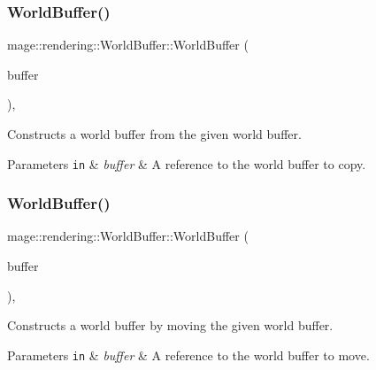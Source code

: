 \subsubsection{\texorpdfstring{World\+Buffer()}{WorldBuffer()}\hspace{0.1cm}{\footnotesize\ttfamily [2/3]}}
{\footnotesize\ttfamily mage\+::rendering\+::\+World\+Buffer\+::\+World\+Buffer (\begin{DoxyParamCaption}\item[{const \mbox{\hyperlink{structmage_1_1rendering_1_1_world_buffer}{World\+Buffer}} \&}]{buffer }\end{DoxyParamCaption})\hspace{0.3cm}{\ttfamily [default]}, {\ttfamily [noexcept]}}

Constructs a world buffer from the given world buffer.


\begin{DoxyParams}[1]{Parameters}
\mbox{\tt in}  & {\em buffer} & A reference to the world buffer to copy. \\
\hline
\end{DoxyParams}
\mbox{\label{structmage_1_1rendering_1_1_world_buffer_ab5cce49c9fe1bbe5e7db5f98df3dbf1a}} 
\subsubsection{\texorpdfstring{World\+Buffer()}{WorldBuffer()}\hspace{0.1cm}{\footnotesize\ttfamily [3/3]}}
{\footnotesize\ttfamily mage\+::rendering\+::\+World\+Buffer\+::\+World\+Buffer (\begin{DoxyParamCaption}\item[{\mbox{\hyperlink{structmage_1_1rendering_1_1_world_buffer}{World\+Buffer}} \&\&}]{buffer }\end{DoxyParamCaption})\hspace{0.3cm}{\ttfamily [default]}, {\ttfamily [noexcept]}}

Constructs a world buffer by moving the given world buffer.


\begin{DoxyParams}[1]{Parameters}
\mbox{\tt in}  & {\em buffer} & A reference to the world buffer to move. \\
\hline
\end{DoxyParams}
\mbox{\label{structmage_1_1rendering_1_1_world_buffer_afdfdecc619400706fa89e24f3ce14a43}} 
